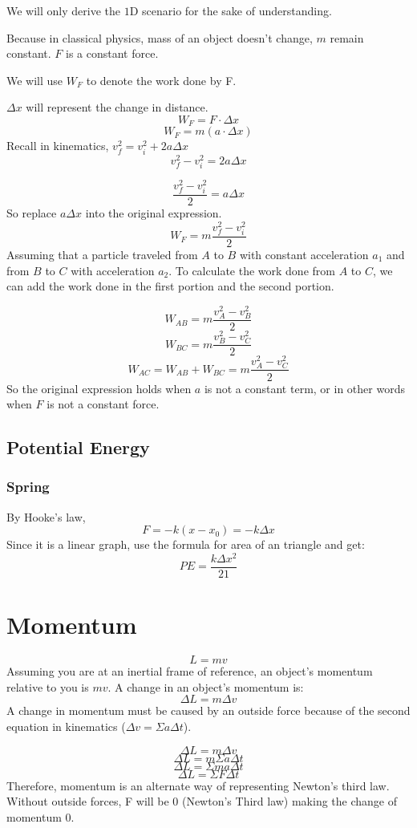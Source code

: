 \documentclass[]{article}
\begin{document}
	We will only derive the $1$D scenario for the sake of understanding. 
	
	Because in classical physics, mass of an object doesn't change, $m$ remain constant.
	$F$ is a constant force.
	
	We will use $W_F$ to denote the work done by F.
	
	$\Delta x$ will represent  the change in distance.
	$$W_F = F \cdot \Delta x$$
	$$W_F = m (a \cdot \Delta x)$$
	Recall in kinematics, $v_f^2 = v^2_i + 2a\Delta x$
	$$v_f^2 - v^2_i = 2a\Delta x$$
	
	$$\frac{v_f^2 - v^2_i}{2} = a\Delta x$$
	So replace $a\Delta x$ into the original expression.
	$$W_F = m \frac{v_f^2 - v^2_i}{2}$$
	Assuming that a particle traveled from $A$ to $B$ with constant acceleration $a_1$ and from $B$ to $C$ with acceleration $a_2$. To calculate the work done from $A$ to $C$, we can add the work done in the first portion and the second portion.
	
	$$W_{AB} = m\frac{v_A^2 -v_B^2}{2}$$
	$$W_{BC} = m\frac{v_B^2 -v_C^2}{2}$$ 
	$$W_{AC} = W_{AB} + W_{BC} = m\frac{v_A^2 -v_C^2}{2}$$
	So the original expression holds when $a$ is not a constant term, or in other words when $F$ is not a constant force. 
	\subsection{Potential Energy}
		\subsubsection{Spring}
			By Hooke's law, 
			$$F = -k (x-x_0) = -k\Delta x$$
			Since it is a linear graph, use the formula for area of an triangle and get:
				$$PE = \frac{k\Delta x^2}{21}$$	

		
\section{Momentum}
$$L = mv$$
Assuming you are at an inertial frame of reference, an object's momentum relative to you is $mv$. A change in an object's momentum is:
$$\Delta L = m \Delta v$$
A change in momentum must be caused by an outside force because of the second equation in kinematics ($\Delta v = \Sigma a\Delta t$).

$$\Delta L = m\Delta v$$
$$\Delta L = m\Sigma a \Delta t$$
$$\Delta L = \Sigma m a \Delta t$$
$$\Delta L = \Sigma F \Delta t$$
Therefore, momentum is an alternate way of representing Newton's third law. Without outside forces, F will be $0$ (Newton's Third law) making the change of momentum $0$. 
 
\end{document}
